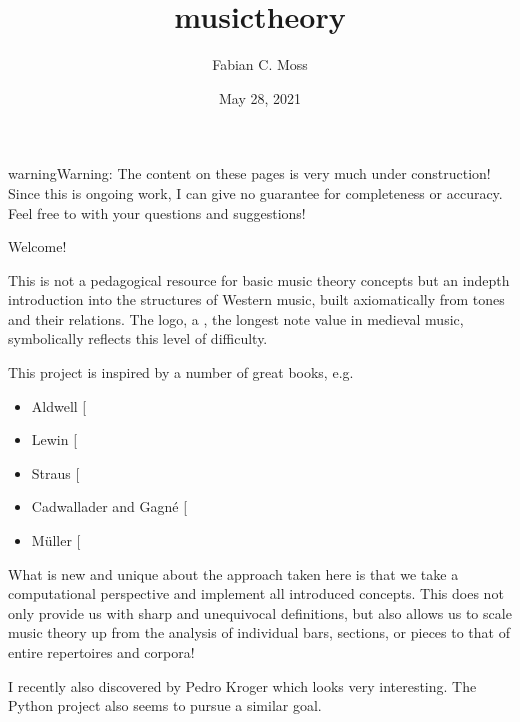 \documentclass[letterpaper,10pt,english]{sphinxmanual}
\title{musictheory}
\date{May 28, 2021}
\author{Fabian C.\@{} Moss}
\begin{document}
\pagestyle{empty}
\sphinxmaketitle
\pagestyle{plain}
\sphinxtableofcontents
\pagestyle{normal}
\label{\detokenize{index::doc}}


\begin{sphinxadmonition}{warning}{Warning:}
The content on these pages is very much under construction!
Since this is ongoing work, I can give no guarantee for completeness or accuracy.
Feel free to  with your questions and suggestions!
\end{sphinxadmonition}

Welcome!

This is not a pedagogical resource for basic music theory concepts
but an in\sphinxhyphen{}depth introduction into the structures of Western music,
built axiomatically from tones and their relations.
The logo, a , the longest note value in medieval music,
symbolically reflects this level of difficulty.

This project is inspired by a number of great books, e.g.
\begin{itemize}
\item {} 
Aldwell  {[}\sphinxcite{8_bibliography:id4}{]}

\item {} 
Lewin {[}\sphinxcite{8_bibliography:id2}{]}

\item {} 
Straus {[}\sphinxcite{8_bibliography:id3}{]}

\item {} 
Cadwallader and Gagné {[}\sphinxcite{8_bibliography:id5}{]}

\item {} 
Müller {[}\sphinxcite{8_bibliography:id6}{]}

\end{itemize}

What is new and unique about the approach taken here is that we take
a computational perspective and implement all introduced concepts.
This does not only provide us with sharp and unequivocal definitions,
but also allows us to scale music theory up from the analysis of individual
bars, sections, or pieces to that of entire repertoires and corpora!

I recently also discovered  by Pedro Kroger
which looks very interesting.
The Python project  also seems to pursue a similar goal.
\end{document}
